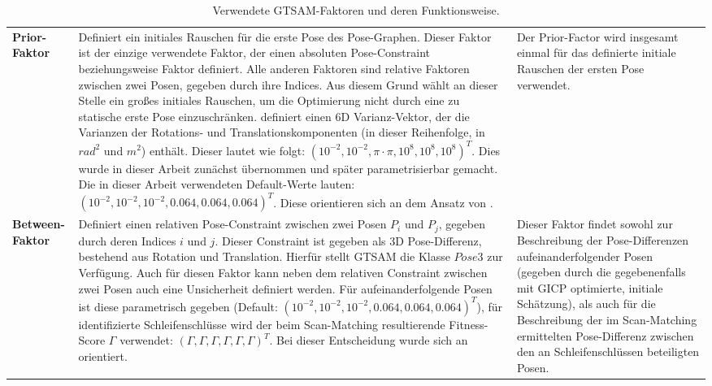 	\begin{table}
		\centering
		\caption{Verwendete GTSAM-Faktoren und deren Funktionsweise.}
		\begin{tabular}{| p{1.7cm} | p{8cm} | p{4cm} |}
			\hline
			\thead{Faktor}   & \thead{Beschreibung}  & \thead{Nutzung}\\
			\hline
			\textbf{Prior-Faktor}   & Definiert ein initiales Rauschen für die erste Pose des Pose-Graphen. Dieser Faktor ist der einzige verwendete Faktor, der einen absoluten Pose-Constraint beziehungsweise Faktor definiert. Alle anderen Faktoren sind relative Faktoren zwischen zwei Posen, gegeben durch ihre Indices. Aus diesem Grund wählt \cite{shan2020lio} an dieser Stelle ein großes initiales Rauschen, um die Optimierung nicht durch eine zu statische erste Pose einzuschränken. \cite{shan2020lio} definiert einen 6D Varianz-Vektor, der die Varianzen der Rotations- und Translationskomponenten (in dieser Reihenfolge, in $rad^2$ und $m^2$) enthält. Dieser lautet wie folgt: $\left( 10^{-2}, 10^{-2}, \pi \cdot \pi, 10^8, 10^8, 10^8 \right)^T$. Dies wurde in dieser Arbeit zunächst übernommen und später parametrisierbar gemacht. Die in dieser Arbeit verwendeten Default-Werte lauten: $\left(10^{-2}, 10^{-2}, 10^{-2}, 0.064, 0.064, 0.064\right)^T$. Diese orientieren sich an dem Ansatz von \cite{HATSDF}. & Der Prior-Factor wird insgesamt einmal für das definierte initiale Rauschen der ersten Pose verwendet. \\
			\hline
			\textbf{Between-Faktor}    & Definiert einen relativen Pose-Constraint zwischen zwei Posen $P_i$ und $P_j$, gegeben durch deren Indices $i$ und $j$. Dieser Constraint ist gegeben als 3D Pose-Differenz, bestehend aus Rotation und Translation. Hierfür stellt GTSAM die Klasse $Pose3$ zur Verfügung. Auch für diesen Faktor kann neben dem relativen Constraint zwischen zwei Posen auch eine Unsicherheit definiert werden. Für aufeinanderfolgende Posen ist diese parametrisch gegeben (Default: $\left(10^{-2}, 10^{-2}, 10^{-2}, 0.064, 0.064, 0.064\right)^T$), für identifizierte Schleifenschlüsse wird der beim Scan-Matching resultierende Fitness-Score $\Gamma$ verwendet: $\left(\Gamma, \Gamma, \Gamma, \Gamma, \Gamma, \Gamma\right)^T$. Bei dieser Entscheidung wurde sich an \cite{shan2020lio} orientiert. & Dieser Faktor findet sowohl zur Beschreibung der Pose-Differenzen aufeinanderfolgender Posen (gegeben durch die gegebenenfalls mit GICP optimierte, initiale Schätzung), als auch für die Beschreibung der im Scan-Matching ermittelten Pose-Differenz zwischen den an Schleifenschlüssen beteiligten Posen. \\
			\hline
		\end{tabular}
		\label{table:gtsam_faktoren}
	\end{table}	

